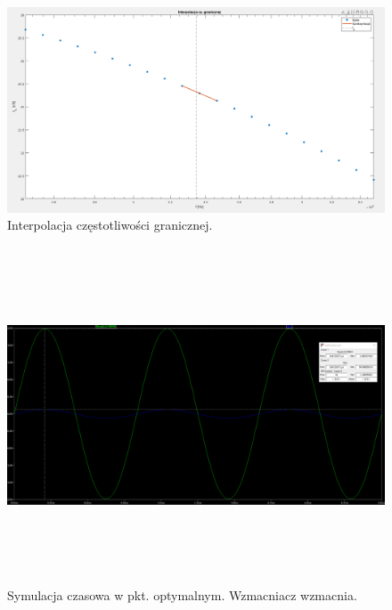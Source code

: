 \documentclass{article}
\begin{document}
\pagebreak
\begin{landscape}
	\begin{figure}[h]
		\vspace*{-2cm}
		\includegraphics[width=20cm,height=10 cm]{graphics/fg_interp.png}
		\centering
		\caption{Interpolacja częstotliwości granicznej.}
	\end{figure}
\end{landscape}

\pagebreak
\begin{landscape}
	\begin{figure}[h]
		\vspace*{-2cm}
		\includegraphics[width=20cm,height=10cm]{graphics/optim_tran.png}
		\centering
		\caption{Symulacja czasowa w pkt. optymalnym. Wzmacniacz wzmacnia.}
	\end{figure}
\end{landscape}
\end{document}
